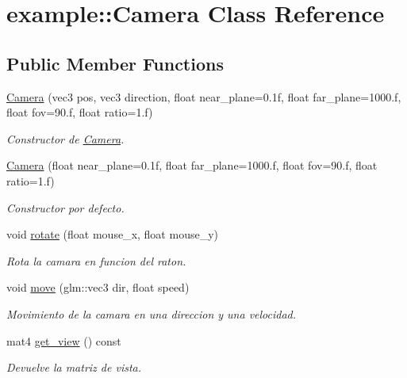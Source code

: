\hypertarget{classexample_1_1_camera}{}\section{example\+::Camera Class Reference}
\label{classexample_1_1_camera}
\subsection*{Public Member Functions}
\begin{DoxyCompactItemize}
\item 
\mbox{\hyperlink{classexample_1_1_camera_ace573e0e67cfac4f812d17739d23e89e}{Camera}} (vec3 pos, vec3 direction, float near\+\_\+plane=0.\+1f, float far\+\_\+plane=1000.\+f, float fov=90.\+f, float ratio=1.\+f)
\begin{DoxyCompactList}\small\item\em Constructor de \mbox{\hyperlink{classexample_1_1_camera}{Camera}}. \end{DoxyCompactList}\item 
\mbox{\hyperlink{classexample_1_1_camera_ab6af454c94947a2547ad0f12ae26bbc4}{Camera}} (float near\+\_\+plane=0.\+1f, float far\+\_\+plane=1000.\+f, float fov=90.\+f, float ratio=1.\+f)
\begin{DoxyCompactList}\small\item\em Constructor por defecto. \end{DoxyCompactList}\item 
void \mbox{\hyperlink{classexample_1_1_camera_ad28315b25725770ec0d63bc3aa2a671a}{rotate}} (float mouse\+\_\+x, float mouse\+\_\+y)
\begin{DoxyCompactList}\small\item\em Rota la camara en funcion del raton. \end{DoxyCompactList}\item 
void \mbox{\hyperlink{classexample_1_1_camera_ac85de92e05dfb5be2d4194dba06ca276}{move}} (glm\+::vec3 dir, float speed)
\begin{DoxyCompactList}\small\item\em Movimiento de la camara en una direccion y una velocidad. \end{DoxyCompactList}\item 
mat4 \mbox{\hyperlink{classexample_1_1_camera_a0422ecf5eb81c6a6c1f816ba4013cd7b}{get\+\_\+view}} () const
\begin{DoxyCompactList}\small\item\em Devuelve la matriz de vista. \end{DoxyCompactList}\item 

\end{DoxyCompactItemize}
